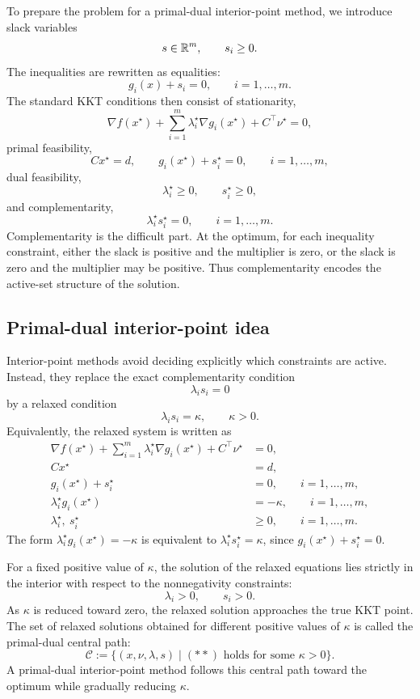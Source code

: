 To prepare the problem for a primal-dual interior-point method, we introduce slack variables
\[
    s\in\mathbb{R}^m,
    \qquad
    s_i\geq 0.
\]
The inequalities are rewritten as equalities:
\[
    g_i(x)+s_i=0,
    \qquad i=1,\ldots,m.
\]
The standard KKT conditions then consist of stationarity,
\[
    \nabla f(x^\star)
    +
    \sum_{i=1}^m
    \lambda_i^\star \nabla g_i(x^\star)
    +
    C^\top \nu^\star
    =
    0,
\]
primal feasibility,
\[
    Cx^\star=d,
    \qquad
    g_i(x^\star)+s_i^\star=0,
    \qquad i=1,\ldots,m,
\]
dual feasibility,
\[
    \lambda_i^\star\geq 0,
    \qquad
    s_i^\star\geq 0,
\]
and complementarity,
\[
    \lambda_i^\star s_i^\star=0,
    \qquad i=1,\ldots,m.
\]
Complementarity is the difficult part. At the optimum, for each inequality constraint, either
the slack is positive and the multiplier is zero, or the slack is zero and the multiplier may be
positive. Thus complementarity encodes the active-set structure of the solution.

\subsection{Primal-dual interior-point idea}

Interior-point methods avoid deciding explicitly which constraints are active. Instead, they
replace the exact complementarity condition
\[
    \lambda_i s_i=0
\]
by a relaxed condition
\[
    \lambda_i s_i=\kappa,
    \qquad \kappa>0.
\]
Equivalently, the relaxed system is written as
\[
\begin{aligned}
    \nabla f(x^\star)
    +
    \sum_{i=1}^{m}\lambda_i^\star\nabla g_i(x^\star)
    +
    C^\top \nu^\star
    &=0,\\
    Cx^\star&=d,\\
    g_i(x^\star)+s_i^\star&=0,
    \qquad i=1,\ldots,m,\\
    \lambda_i^\star g_i(x^\star)&=-\kappa,
    \qquad i=1,\ldots,m,\\
    \lambda_i^\star,\ s_i^\star&\geq 0,
    \qquad i=1,\ldots,m.
\end{aligned}
\tag{**}
\]
The form \(\lambda_i^\star g_i(x^\star)=-\kappa\) is equivalent to
\(\lambda_i^\star s_i^\star=\kappa\), since \(g_i(x^\star)+s_i^\star=0\).

For a fixed positive value of \(\kappa\), the solution of the relaxed equations lies strictly in
the interior with respect to the nonnegativity constraints:
\[
    \lambda_i>0,
    \qquad
    s_i>0.
\]
As \(\kappa\) is reduced toward zero, the relaxed solution approaches the true KKT point. The
set of relaxed solutions obtained for different positive values of \(\kappa\) is called the
primal-dual central path:
\[
    \mathcal{C}
    :=
    \{(x,\nu,\lambda,s)\mid (**) \text{ holds for some } \kappa>0\}.
\]
A primal-dual interior-point method follows this central path toward the optimum while
gradually reducing \(\kappa\).

